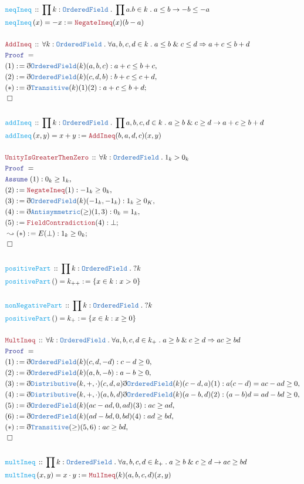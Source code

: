 \documentclass[12pt]{scrartcl}
\newcommand{\TYPE}[1]{\textcolor{NavyBlue}{\mathtt{#1}}}
\newcommand{\FUNC}[1]{\textcolor{Cerulean}{\mathtt{#1}}}
\newcommand{\LOGIC}[1]{\textcolor{Blue}{\mathtt{#1}}}
\newcommand{\THM}[1]{\textcolor{Maroon}{\mathtt{#1}}}
\renewcommand{\.}{\; . \;}
\newcommand{\de}{: \kern 0.1pc =}
\newcommand{\Act}[1]{\left( #1 \right)}
\newcommand{\Theorem}[2]{& \THM{#1} \, :: \, #2 \\ & \Proof = \\ }
\newcommand{\DeclareFunc}[2]{& \FUNC{#1} \, :: \, #2 \\}
\newcommand{\DefineNamedFunc}[4]{&  \FUNC{#1}\Act{#2} = #3 \de #4 \\}
\newcommand{\Page}[1]{ \begin{align*} #1 \end{align*}   }
\newcommand{ \bd }{ \ByDef }
\renewcommand{\And}{\; \& \;}
\newcommand{\Say}[3]{& #1 \de #2 : #3, \\}
\newcommand{\Conclude}[3]{& #1 \de #2 : #3; \\}
\newcommand{\DeriveConclude}[3]{& \leadsto #1 \de #2 : #3 ; \\}
\newcommand{\A}{\LOGIC{Assume} \;}
\newcommand{\Assume}[2]{& \A #1 : #2, \\}
\newcommand{\QED}{\; \square}
\newcommand{\EndProof}{& \QED \\}
\newcommand{\ByDef}{\eth}
\newcommand{\Proof}{\LOGIC{Proof} \; }
\newcommand{\OF}{\TYPE{OrderedField}}
\begin{document}
\Page{
\DeclareFunc{neqIneq}{ \prod k : \OF \. \prod a.b \in k \. a \le b \to -b \le -a  }
\DefineNamedFunc{ neqIneq  }{x}{ -x}{\THM{NegateIneq}(x)(b - a)}
\\
\Theorem{AddIneq}{\forall k : \OF \. \forall a,b,c, d \in k \. a \le b \And c \le d \Rightarrow a + c \le b + d }
\Say{(1) }{  \bd\OF(k)(a,b,c)  }{ a + c \le b + c }
\Say{(2)}{ \bd\OF(k)(c,d,b)}{b + c \le c + d}
\Conclude{(*)}{\bd \TYPE{Transitive}(k)(1)(2)}{ a + c \le b + d}
\EndProof
\\
\DeclareFunc{addIneq}{\prod k : \OF \. \prod a,b,c,d \in k \. a \ge b \And c \ge d \to a  + c \ge b + d}
\DefineNamedFunc{addIneq}{x,y}{x + y}{\THM{AddIneq}(b,a,d,c)(x,y)} 
\\
\Theorem{UnityIsGreaterThenZero}{\forall k : \OF \. 1_k > 0_k}
\Assume{ (1)}{ 0_k \ge 1_k }
\Say{(2)}{\THM{NegateIneq}(1)}{-1_k \ge 0_k}
\Say{(3)}{\bd \OF(k)(-1_k,-1_k)}{1_k \ge 0_K}
\Say{(4)}{\bd \TYPE{Antisymmetric}(\ge)(1,3)}{0_k = 1_k}
\Conclude{(5)}{\THM{FieldContradiction}(4)}{\bot}
\DeriveConclude{(*)}{E(\bot)}{1_k \ge 0_k}
\EndProof
\\
\DeclareFunc{positivePart}{ \prod k : \OF \. ?k }
\DefineNamedFunc{positivePart}{}{k_{++}}{\{x \in k : x > 0  \}}
\\
\DeclareFunc{nonNegativePart}{\prod k : \OF \. ?k}
\DefineNamedFunc{positivePart}{}{k_{+}}{\{x \in k : x \ge 0 \}}
\\
\Theorem{MultIneq}{\forall k : \OF \. \forall a,b,c,d \in k_+ \. a \ge b \And c \ge d \Rightarrow ac \ge bd  }
\Say{(1)}{\bd \OF(k)(c,d,-d)}{c - d \ge 0}
\Say{(2)}{\bd \OF(k)(a,b,-b)}{a - b \ge 0}
\Say{(3)}{\bd \TYPE{Distributive}(k,+,\cdot)(c,d,a)\bd \OF(k)(c - d, a )(1)  }{ a(c - d) = ac - ad \ge 0   }
\Say{(4)}{\bd \TYPE{Distributive}(k,+,\cdot)(a,b,d)\bd \OF(k)(a -b, d)(2) }{ (a - b)d = ad - bd \ge 0 }
\Say{(5)}{\bd \OF(k)(ac - ad, 0,ad)(3)}{ ac \ge ad  }
\Say{(6)}{\bd \OF(k)(ad - bd,0,bd)(4)}{ad \ge bd}
\Say{(*)}{\bd \TYPE{Transitive}(\ge)(5,6)}{ ac \ge bd}
\EndProof
\\
\DeclareFunc{multIneq}{\prod k :  \OF \. \forall a,b,c,d \in k_+ \. a \ge b \And c \ge d \to ac \ge bd}
\DefineNamedFunc{multIneq}{x,y}{x \cdot y}{  \THM{MulIneq}(k)(a,b,c,d)(x,y)    } 
}
\end{document}
